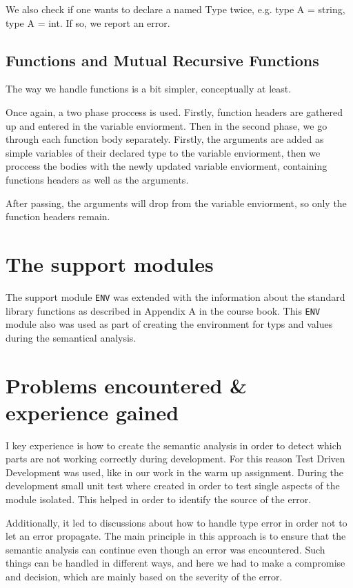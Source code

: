 \documentclass{article}
\begin{document}
We also check if one wants to declare a named Type twice, e.g. type A = string, type A = int. If so, we report an error.

\subsection{Functions and Mutual Recursive Functions}

The way we handle functions is a bit simpler, conceptually at least.

Once again, a two phase proccess is used. Firstly, function headers are gathered up and entered in the variable enviorment. Then in the second phase,
we go through each function body separately. Firstly, the arguments are added as simple variables of their declared type to the 
variable enviorment, then we proccess the bodies with the newly updated variable enviorment, containing functions headers as
well as the arguments.

After passing, the arguments will drop from the variable enviorment, so only the function headers remain.

\section{The support modules}

The support module \texttt{ENV} was extended with the information about the standard library functions as described in Appendix A in the course book. This \texttt{ENV} module also was used as part of creating the environment for typs and values during the semantical analysis. 


\section{Problems encountered \& experience gained}

I key experience is how to create the semantic analysis in order to detect which parts are not working correctly during development. For this reason Test Driven Development was used, like in our work in the warm up assignment. During the development small unit test where created in order to test single aspects of the module isolated. This helped in order to identify the source of the error.

Additionally, it led to discussions about how to handle type error in order not to let an error propagate. The main principle in this approach is to ensure that the semantic analysis can continue even though an error was encountered. Such things can be handled in different ways, and here we had to make a compromise and decision, which are mainly based on the severity of the error.
\end{document}

